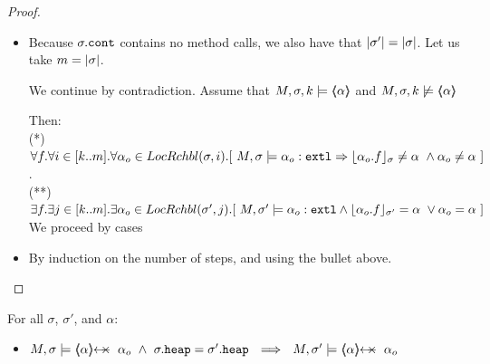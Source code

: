 \begin{proof} $~ $

\begin{itemize}
\item
Because $\sigma.\prg{cont}$   contains no method calls, we also have that $\DepthSt {\sigma'}=\DepthSt {\sigma}$. Let us take
$m=\DepthSt {\sigma}$.

We continue by contradiction.
 Assume that $\satDAssertFrom M  {\sigma} k   {\inside{\alpha}}$ and $\notSatDAssertFrom M  {\sigma} k   {\inside{\alpha}}$  

Then:\\
(*)\ $\forall f.\forall i\in [k..m].\forall \alpha_o\in  \LRelevantKO {\sigma} {i}.[\ M, \sigma \models \external {\alpha_o} \Rightarrow \interpret {\sigma} {\alpha_o.f} \neq \alpha\ \wedge \alpha_o \neq \alpha \ ] $.
\\
(**) $\exists f.\exists  j\in [k..m].\exists \alpha_o\in  \LRelevantKO {\sigma'} {j}.[\ M, \sigma' \models \external {\alpha_o} \wedge \interpret {\sigma'} {\alpha_o.f} = \alpha\ \vee \alpha_o = \alpha\ ] $
\\
We proceed by cases

\item
By induction on the   number of steps, and using the bullet above.
\end{itemize}

\end{proof}


 
  {
 \begin{lemma} For all $\sigma$, $\sigma'$, and $\alpha$:
 \label{lemma:protTwo}
\begin{itemize}
\item
$  M, \sigma  \models    { \protectedFrom \alpha {\alpha_o}}  \ \wedge\   \sigma.\prg{heap}= \sigma'.\prg{heap} \ \ \Longrightarrow\ \  M, \sigma' \models      { \protectedFrom \alpha {\alpha_o}} $
\end{itemize}
\end{lemma}
}

